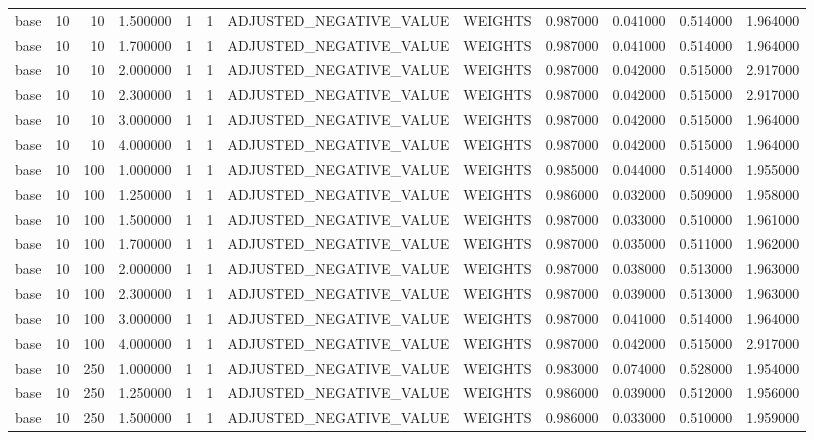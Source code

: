 \begin{tabular}{lrrrllllrrrr}
base & 10 & 10 & 1.500000 & 1 & 1 & ADJUSTED_NEGATIVE_VALUE & WEIGHTS & 0.987000 & 0.041000 & 0.514000 & 1.964000 \\
base & 10 & 10 & 1.700000 & 1 & 1 & ADJUSTED_NEGATIVE_VALUE & WEIGHTS & 0.987000 & 0.041000 & 0.514000 & 1.964000 \\
base & 10 & 10 & 2.000000 & 1 & 1 & ADJUSTED_NEGATIVE_VALUE & WEIGHTS & 0.987000 & 0.042000 & 0.515000 & 2.917000 \\
base & 10 & 10 & 2.300000 & 1 & 1 & ADJUSTED_NEGATIVE_VALUE & WEIGHTS & 0.987000 & 0.042000 & 0.515000 & 2.917000 \\
base & 10 & 10 & 3.000000 & 1 & 1 & ADJUSTED_NEGATIVE_VALUE & WEIGHTS & 0.987000 & 0.042000 & 0.515000 & 1.964000 \\
base & 10 & 10 & 4.000000 & 1 & 1 & ADJUSTED_NEGATIVE_VALUE & WEIGHTS & 0.987000 & 0.042000 & 0.515000 & 1.964000 \\
base & 10 & 100 & 1.000000 & 1 & 1 & ADJUSTED_NEGATIVE_VALUE & WEIGHTS & 0.985000 & 0.044000 & 0.514000 & 1.955000 \\
base & 10 & 100 & 1.250000 & 1 & 1 & ADJUSTED_NEGATIVE_VALUE & WEIGHTS & 0.986000 & 0.032000 & 0.509000 & 1.958000 \\
base & 10 & 100 & 1.500000 & 1 & 1 & ADJUSTED_NEGATIVE_VALUE & WEIGHTS & 0.987000 & 0.033000 & 0.510000 & 1.961000 \\
base & 10 & 100 & 1.700000 & 1 & 1 & ADJUSTED_NEGATIVE_VALUE & WEIGHTS & 0.987000 & 0.035000 & 0.511000 & 1.962000 \\
base & 10 & 100 & 2.000000 & 1 & 1 & ADJUSTED_NEGATIVE_VALUE & WEIGHTS & 0.987000 & 0.038000 & 0.513000 & 1.963000 \\
base & 10 & 100 & 2.300000 & 1 & 1 & ADJUSTED_NEGATIVE_VALUE & WEIGHTS & 0.987000 & 0.039000 & 0.513000 & 1.963000 \\
base & 10 & 100 & 3.000000 & 1 & 1 & ADJUSTED_NEGATIVE_VALUE & WEIGHTS & 0.987000 & 0.041000 & 0.514000 & 1.964000 \\
base & 10 & 100 & 4.000000 & 1 & 1 & ADJUSTED_NEGATIVE_VALUE & WEIGHTS & 0.987000 & 0.042000 & 0.515000 & 2.917000 \\
base & 10 & 250 & 1.000000 & 1 & 1 & ADJUSTED_NEGATIVE_VALUE & WEIGHTS & 0.983000 & 0.074000 & 0.528000 & 1.954000 \\
base & 10 & 250 & 1.250000 & 1 & 1 & ADJUSTED_NEGATIVE_VALUE & WEIGHTS & 0.986000 & 0.039000 & 0.512000 & 1.956000 \\
base & 10 & 250 & 1.500000 & 1 & 1 & ADJUSTED_NEGATIVE_VALUE & WEIGHTS & 0.986000 & 0.033000 & 0.510000 & 1.959000 \\

\end{tabular}
